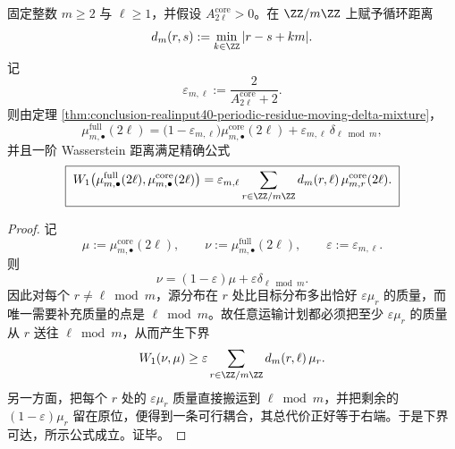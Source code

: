\begin{corollary}\label{cor:conclusion-realinput40-periodic-residue-w1-exact}
固定整数 \(m\ge 2\) 与 \(\ell\ge 1\)，并假设 \(A_{2\ell}^{\mathrm{core}}>0\)。在 \(\ZZ/m\ZZ\) 上赋予循环距离
\[
d_m(r,s):=\min_{k\in\ZZ}|r-s+km|.
\]
记
\[
\varepsilon_{m,\ell}:=\frac{2}{A_{2\ell}^{\mathrm{core}}+2}.
\]
则由定理 \ref{thm:conclusion-realinput40-periodic-residue-moving-delta-mixture}，
\[
\mu_{m,\bullet}^{\mathrm{full}}(2\ell)
=
\bigl(1-\varepsilon_{m,\ell}\bigr)\mu_{m,\bullet}^{\mathrm{core}}(2\ell)
+\varepsilon_{m,\ell}\,\delta_{\ell\bmod m},
\]
并且一阶 Wasserstein 距离满足精确公式
\[
\boxed{\;
W_1\!\left(
\mu_{m,\bullet}^{\mathrm{full}}(2\ell),
\mu_{m,\bullet}^{\mathrm{core}}(2\ell)
\right)
=
\varepsilon_{m,\ell}
\sum_{r\in\ZZ/m\ZZ}
d_m(r,\ell)\,\mu_{m,r}^{\mathrm{core}}(2\ell).\;}
\]
\end{corollary}
\begin{proof}
记
\[
\mu:=\mu_{m,\bullet}^{\mathrm{core}}(2\ell),
\qquad
\nu:=\mu_{m,\bullet}^{\mathrm{full}}(2\ell),
\qquad
\varepsilon:=\varepsilon_{m,\ell}.
\]
则
\[
\nu=(1-\varepsilon)\mu+\varepsilon\delta_{\ell\bmod m}.
\]
因此对每个 \(r\neq \ell\bmod m\)，源分布在 \(r\) 处比目标分布多出恰好 \(\varepsilon\mu_r\) 的质量，而唯一需要补充质量的点是 \(\ell\bmod m\)。故任意运输计划都必须把至少 \(\varepsilon\mu_r\) 的质量从 \(r\) 送往 \(\ell\bmod m\)，从而产生下界
\[
W_1(\nu,\mu)\ge \varepsilon\sum_{r\in\ZZ/m\ZZ}d_m(r,\ell)\,\mu_r.
\]
另一方面，把每个 \(r\) 处的 \(\varepsilon\mu_r\) 质量直接搬运到 \(\ell\bmod m\)，并把剩余的 \((1-\varepsilon)\mu_r\) 留在原位，便得到一条可行耦合，其总代价正好等于右端。于是下界可达，所示公式成立。证毕。
\end{proof}

